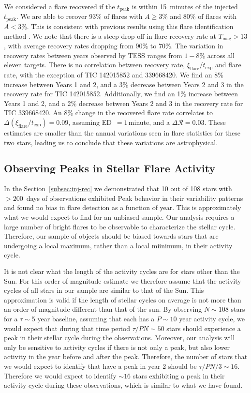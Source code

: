 \documentclass[twocolumn, linenumbers]{aastex631}
\begin{document}
We considered a flare recovered if the $t_\textrm{peak}$ is within 15~minutes of
the injected $t_\textrm{peak}$. We are able to recover 93\% of flares with
$A \geq 3$\% and 80\% of flares with $A < 3$\%. This is consistent with previous
results using this flare identification method \citep{feinstein20}. We note that
there is a steep drop-off in flare recovery rate at $T_\textrm{mag} > 13$, with
average recovery rates dropping from  90\% to 70\%.  The variation in recovery rates
between years observed by TESS ranges from $1 - 8$\% across all eleven targets.
There is no correlation between recovery rate,  $\xi_\textrm{flare}/t_\textrm{exp}$
and flare rate, with the exception of TIC 142015852 and 339668420. We find an 8\%
increase between Years 1 and 2, and a 3\% decrease between Years 2 and 3 in the
recovery rate for TIC 142015852. Additionally, we find an 1\% increase between
Years 1 and 2, and a 2\% decrease between Years 2 and 3 in the recovery rate for
TIC 339668420. An 8\% change in the recovered flare rate correlates to
$\Delta (\xi_\textrm{flare} / t_\textrm{exp}) = 0.09$, assuming ED~$= 1$\,minute,
and a $\Delta \mathcal{R} = 0.03$. These estimates are smaller than the annual
variations seen in flare statistics for these two stars, leading us to conclude
that these variations are astrophysical.


\subsection{Observing Peaks in Stellar Flare Activity}

In the Section~\ref{subsec:inj-rec} we demonstrated that 10 out of 108 stars with
$> 200$~days of observations exhibited Peak behavior in their variability patterns
and found no bias in flare detection as a function of year. This is approximately
what we would expect to find for an unbiased sample. Our analysis requires a large
number of bright flares to be observable to characterize the stellar cycle. Therefore,
our sample of objects should be biased towards stars that are undergoing a local
maximum, rather than a local miinimum, in their activity cycle.

It is not clear what the length of the activity cycles are for stars other than
the Sun. For this order of magnitude estimate we therefore assume that the activity
cycles of all stars in our sample are similar to that of the Sun. This approximation
is valid   if the length of stellar cycles on average is not more than an order
of magnitude different than that of the sun. By observing $N\sim$108 stars for a
$\tau\sim$5 year baseline, assuming that each has a $P\sim10$ year activity cycle,
we would expect that during that time period $\tau /P N\sim50$ stars should
experience a peak in their stellar cycle during the observations. Moreover, our
analysis will only be sensitive to activity cycles if there is not only a peak,
but also lower activity in the year before and after the peak. Therefore, the
number of stars that we would expect to identify that have a peak in year 2 should
be $\tau /P N /3\sim16$. Therefore we would expect to identify $\sim16$ stars
exhibiting a peak in their activity cycle during these observations, which is
similar to what we have found.
\end{document}
